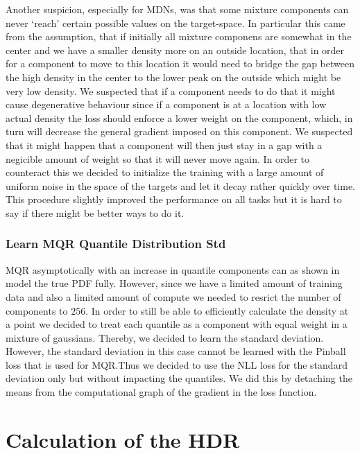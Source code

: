 Another suspicion, especially for MDNs, was that some mixture components can never `reach' certain possible values on the target-space. In particular this came from the assumption, that if initially all mixture componens are somewhat in the center and we have a smaller density more on an outside location, that in order for a component to move to this location it would need to bridge the gap between the high density in the center to the lower peak on the outside which might be very low density. We suspected that if a component needs to do that it might cause degenerative behaviour since if a component is at a location with low actual density the loss should enforce a lower weight on the component, which, in turn will decrease the general gradient imposed on this component. We suspected that it might happen that a component will then just stay in a gap with a negicible amount of weight so that it will never move again. In order to counteract this we decided to initialize the training with a large amount of uniform noise in the space of the targets and let it decay rather quickly over time. This procedure slightly improved the performance on all tasks but it is hard to say if there might be better ways to do it.

\subsubsection{Learn MQR Quantile Distribution Std}\label{sec:learn_mqr_quantile_std}

MQR asymptotically with an increase in quantile components can as shown in  model the true PDF fully. However, since we have a limited amount of training data and also a limited amount of compute we needed to resrict the number of components to $256$. In order to still be able to efficiently calculate the density at a point we decided to treat each quantile as a component with equal weight in a mixture of gaussians. Thereby, we decided to learn the standard deviation. However, the standard deviation in this case cannot be learned with the Pinball loss that is used for MQR.\@ Thus we decided to use the NLL loss for the standard deviation only but without impacting the quantiles. We did this by detaching the means from the computational graph of the gradient in the loss function.


\section{Calculation of the HDR}\label{sec:calculation_hdr}


